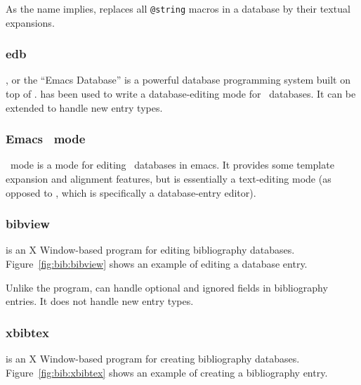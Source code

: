 As the name implies,  replaces
all \verb|@string| macros in a database by their textual expansions.

\subsubsection{edb}

, or the ``Emacs Database'' is a powerful database
programming system built on top of .   has been used to write a database-editing mode
for \BibTeX\ databases.  It can be extended to handle new entry types.

\subsubsection{Emacs \protect\BibTeX\ mode}

\BibTeX\ mode is a 
mode for editing \BibTeX\ databases in emacs.  It provides some template
expansion and alignment features, but is essentially a text-editing mode
(as opposed to , which is specifically a database-entry editor).

\newpage
\subsubsection{bibview}

 is an X Window-based program for editing
bibliography databases.  Figure~\ref{fig:bib:bibview} shows an example of
 editing a database entry.

%
      
Unlike the  program,  can handle optional
and ignored fields in bibliography entries.
It does not handle new entry types.

\subsubsection{xbibtex}

 is an X Window-based program for creating
bibliography databases.  Figure~\ref{fig:bib:xbibtex} shows an example of
 creating a bibliography entry.

